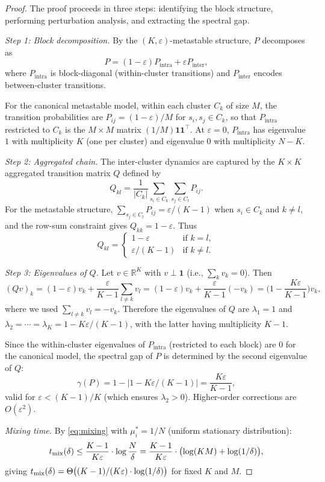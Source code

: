 \begin{proof}
The proof proceeds in three steps: identifying the block structure,
performing perturbation analysis, and extracting the spectral gap.

\emph{Step 1: Block decomposition.} By the $(K, \varepsilon)$-metastable
structure, $P$ decomposes as
\[
  P = (1 - \varepsilon) P_{\mathrm{intra}} + \varepsilon P_{\mathrm{inter}},
\]
where $P_{\mathrm{intra}}$ is block-diagonal (within-cluster transitions) and
$P_{\mathrm{inter}}$ encodes between-cluster transitions.

For the canonical metastable model, within each cluster $C_k$ of size $M$,
the transition probabilities are $P_{ij} = (1 - \varepsilon)/M$ for
$s_i, s_j \in C_k$, so that $P_{\mathrm{intra}}$ restricted to $C_k$ is the
$M \times M$ matrix $(1/M)\mathbf{1}\mathbf{1}^\top$. At $\varepsilon = 0$,
$P_{\mathrm{intra}}$ has eigenvalue $1$ with multiplicity $K$ (one per
cluster) and eigenvalue $0$ with multiplicity $N - K$.

\emph{Step 2: Aggregated chain.} The inter-cluster dynamics are captured by
the $K \times K$ aggregated transition matrix $Q$ defined by
\[
  Q_{kl} = \frac{1}{|C_k|} \sum_{s_i \in C_k} \sum_{s_j \in C_l} P_{ij}.
\]
For the metastable structure, $\sum_{s_j \in C_l} P_{ij} = \varepsilon/(K-1)$
when $s_i \in C_k$ and $k \ne l$, and the row-sum constraint gives
$Q_{kk} = 1 - \varepsilon$. Thus
\begin{equation}\label{eq:Q_matrix}
  Q_{kl} = \begin{cases}
    1 - \varepsilon & \text{if } k = l, \\
    \varepsilon / (K - 1) & \text{if } k \ne l.
  \end{cases}
\end{equation}

\emph{Step 3: Eigenvalues of $Q$.} Let $v \in \mathbb{R}^K$ with
$v \perp \mathbf{1}$ (i.e., $\sum_k v_k = 0$). Then
\[
  (Qv)_k = (1 - \varepsilon) v_k + \frac{\varepsilon}{K - 1}
  \sum_{l \ne k} v_l
  = (1 - \varepsilon) v_k + \frac{\varepsilon}{K - 1}(-v_k)
  = \biggl(1 - \frac{K\varepsilon}{K - 1}\biggr) v_k,
\]
where we used $\sum_{l \ne k} v_l = -v_k$. Therefore the eigenvalues of $Q$
are $\lambda_1 = 1$ and $\lambda_2 = \cdots = \lambda_K = 1 - K\varepsilon/(K-1)$,
with the latter having multiplicity $K - 1$.

Since the within-cluster eigenvalues of $P_{\mathrm{intra}}$ (restricted to
each block) are $0$ for the canonical model, the spectral gap of $P$ is
determined by the second eigenvalue of $Q$:
\[
  \gamma(P) = 1 - |1 - K\varepsilon/(K-1)| = \frac{K\varepsilon}{K - 1},
\]
valid for $\varepsilon < (K-1)/K$ (which ensures $\lambda_2 > 0$). Higher-order
corrections are $O(\varepsilon^2)$.

\emph{Mixing time.} By \eqref{eq:mixing} with $\mu^*_i = 1/N$ (uniform
stationary distribution):
\[
  t_{\operatorname{mix}}(\delta) \le \frac{K - 1}{K\varepsilon} \cdot \log \frac{N}{\delta}
  = \frac{K - 1}{K\varepsilon} \cdot \bigl(\log(KM) + \log(1/\delta)\bigr),
\]
giving $t_{\operatorname{mix}}(\delta) = \Theta\bigl((K-1)/(K\varepsilon) \cdot \log(1/\delta)\bigr)$
for fixed $K$ and $M$.
\end{proof}

